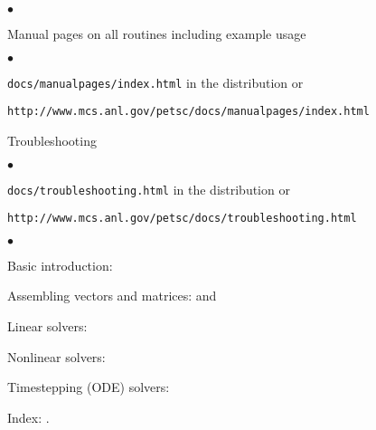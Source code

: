 \documentclass{article}
\begin{document}


\medskip

\begin{list}{$\bullet$}
\item Manual pages on all routines including example usage
\begin{list}{$\bullet$}
   \item {\tt docs/manualpages/index.html} in the distribution or 
   \item {\tt http://www.mcs.anl.gov/petsc/docs/manualpages/index.html}
\end{list}
\item Troubleshooting
\begin{list}{$\bullet$}
   \item {\tt docs/troubleshooting.html} in the distribution or
   \item {\tt http://www.mcs.anl.gov/petsc/docs/troubleshooting.html}
\end{list}
\end{list}

\begin{list}{$\bullet$}
{
\setlength{\itemsep}{-.02in} 
\setlength{\topsep}{0in} 
\setlength{\partopsep}{0in}
}
\item Basic introduction: \pageref{sec:gettingstarted}
\item Assembling vectors and matrices: \pageref{sec:vecintro} and \pageref{sec:matintro}
\item Linear solvers: \pageref{ch:sles}
\item Nonlinear solvers: \pageref{chapter:snes}
\item Timestepping (ODE) solvers: \pageref{chapter:ts}
\item Index: \pageref{sec:index}.
\end{list}
\end{document}
